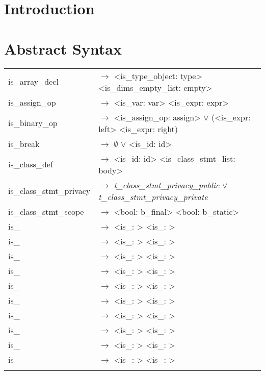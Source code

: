 \documentclass[a4paper]{article}
\title{\documentTitle}
\author{\documentAuthors{}}
\begin{document}
\renewcommand{\figurename}{Figure}
\maketitle
\cleardoublepage

\tableofcontents
\cleardoublepage

\setlength{\parindent}{1cm}
\setlength{\parskip}{0.3cm}

\section{Introduction}
\section{Abstract Syntax}
\begin{tabular}{ll}
	is\_array\_decl 			& $\to$ <is\_type\_object: type> <is\_dims\_empty\_list: empty> \\
	is\_assign\_op				& $\to$ <is\_var: var> <is\_expr: expr> \\
	is\_binary\_op				& $\to$ <is\_assign\_op: assign> $\vee$ (<is\_expr: left> <is\_expr: right) \\
	is\_break 					& $\to$ $\emptyset$ $\vee$ <is\_id: id> \\
	is\_class\_def				& $\to$ <is\_id: id> <is\_class\_stmt\_list: body> \\
	is\_class\_stmt\_privacy	& $\to$ \emph{t\_class\_stmt\_privacy\_public} $\vee$ \emph{t\_class\_stmt\_privacy\_private} \\	
	is\_class\_stmt\_scope		& $\to$ <bool: b\_final> <bool: b\_static> \\
	is\_ & $\to$ <is\_: > <is\_: > \\
	is\_ & $\to$ <is\_: > <is\_: > \\
	is\_ & $\to$ <is\_: > <is\_: > \\
	is\_ & $\to$ <is\_: > <is\_: > \\
	is\_ & $\to$ <is\_: > <is\_: > \\
	is\_ & $\to$ <is\_: > <is\_: > \\
	is\_ & $\to$ <is\_: > <is\_: > \\
	is\_ & $\to$ <is\_: > <is\_: > \\
	is\_ & $\to$ <is\_: > <is\_: > \\
	is\_ & $\to$ <is\_: > <is\_: > \\
\begin{comment}
typedef enum
{
	t_class_stmt_privacy_public,
	t_class_stmt_privacy_private
} is_class_stmt_privacy;


\end{comment}
\end{tabular}
\end{document}
